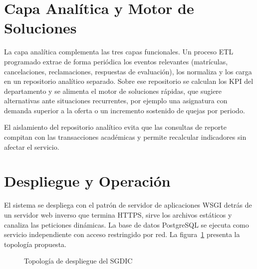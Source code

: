 \section{Capa Analítica y Motor de Soluciones}
\label{sec:analitica}

La capa analítica complementa las tres capas funcionales. Un proceso \ac{ETL}
programado extrae de forma periódica los eventos relevantes (matrículas,
cancelaciones, reclamaciones, respuestas de evaluación), los normaliza y los
carga en un repositorio analítico separado. Sobre ese repositorio se calculan
los \ac{KPI} del departamento y se alimenta el motor de soluciones rápidas, que
sugiere alternativas ante situaciones recurrentes, por ejemplo una asignatura
con demanda superior a la oferta o un incremento sostenido de quejas por
periodo.

El aislamiento del repositorio analítico evita que las consultas de reporte
compitan con las transacciones académicas y permite recalcular indicadores sin
afectar el servicio.

\section{Despliegue y Operación}
\label{sec:despliegue}

El sistema se despliega con el patrón de servidor de aplicaciones \ac{WSGI}
detrás de un servidor web inverso que termina \ac{HTTPS}, sirve los archivos
estáticos y canaliza las peticiones dinámicas. La base de datos PostgreSQL se
ejecuta como servicio independiente con acceso restringido por red. La
figura~\ref{fig:despliegue} presenta la topología propuesta.

\begin{figure}[H]
\centering
{}%
\caption{Topología de despliegue del \ac{SGDIC}}
\label{fig:despliegue}
\end{figure}

